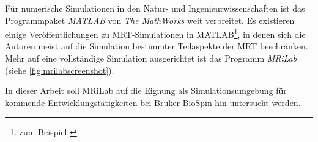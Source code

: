 Für numerische Simulationen in den Natur- und Ingenieurwissenschaften ist das Programmpaket \textit{MATLAB}\cite{matlab} von \textit{The MathWorks} weit verbreitet. Es existieren einige Ver\-öffent\-lichungen zu MRT-Simulationen in MATLAB\footnote{zum Beispiel \cite{Kern2012}}, in denen sich die Autoren meist auf die Simulation bestimmter Teilaspekte der MRT beschränken. Mehr auf eine vollständige Simulation ausgerichtet ist das Programm \textit{MRiLab}\cite{Liu2017} (siehe \autoref{fig:mrilabscreenshot}).


In dieser Arbeit soll MRiLab auf die Eignung als Simulationsumgebung für kommende Entwicklungstätigkeiten bei Bruker BioSpin hin untersucht werden.


